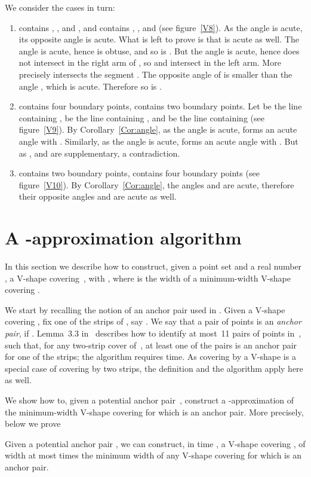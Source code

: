 \documentclass{llncs}
\begin{document}
We consider the cases in turn:
\begin{enumerate} \itemsep 0pt \parsep 0pt \parskip 0pt
\item  contains , , and , and  contains
  , , and 
(see figure~\ref{V8}).
As the angle  is acute, its opposite angle  is acute. 
What is left to prove is that  is acute as well.
The angle  is acute, hence  is obtuse,
and so is .
But the angle  is acute, hence  does not intersect  in the right arm of , so  and  intersect in the left arm.
More precisely  intersects the segment .
The opposite angle of  is smaller than the angle , which is acute.
Therefore so is .
\item  contains four boundary points,  contains two boundary points.
Let  be the line containing ,  be the line containing , and  be the line containing  (see figure~\ref{V9}).
By Corollary~\ref{Cor:angle}, as the angle  is acute,  forms an acute angle  with .
Similarly, as the angle  is acute,  forms an acute angle  with .
But as ,  and  are supplementary, a contradiction.
\item  contains two boundary points,  contains four boundary points (see figure~\ref{V10}).
By Corollary~\ref{Cor:angle}, the angles  and  are acute, therefore their opposite angles  and  are acute as well.
\end{enumerate}





\section{A -approximation algorithm}
\label{sec:one+eps}

In this section we describe how to construct, given a point set 
and a real number , a V-shape  covering~, with
, where  is the width of a
minimum-width V-shape covering .

We start by recalling the notion of an anchor pair used in
\cite{2-line-center}.  Given a V-shape~ covering , fix one of
the strips of , say .  We say that a pair of points  is an \emph{anchor pair}, if .  Lemma~3.3 in~\cite{2-line-center} describes how to identify
at most~11 pairs of points in~, such that, for any two-strip cover
of~, at least one of the pairs is an anchor pair for one of the
strips; the algorithm requires  time.  As covering by a
V-shape is a special case of covering by two strips, the definition
and the algorithm apply here as well.

We show how to, given a potential anchor pair~, construct a
-approximation of the minimum-width V-shape covering  for
which  is an anchor pair.  More precisely, below we prove
\begin{lemma}
  \label{lem:fixed-anchor-pair}
  Given a potential anchor pair , we can construct, in time
  , a V-shape
  covering , of width at most  times the minimum width of
  any V-shape covering  for which  is an anchor pair.
\end{lemma}
\end{document}
